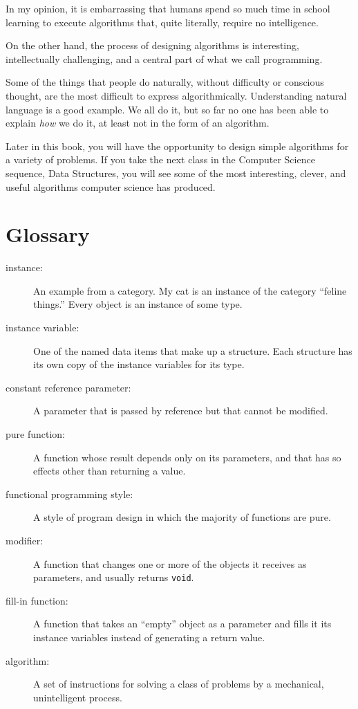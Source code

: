 In my opinion, it is embarrassing that humans spend so much time in
school learning to execute algorithms that, quite literally, require
no intelligence.

On the other hand, the process of designing algorithms is interesting,
intellectually challenging, and a central part of what we call
programming.

Some of the things that people do naturally, without difficulty
or conscious thought, are the most difficult to express
algorithmically.  Understanding natural language is a good
example.  We all do it, but so far no one has been able to
explain {\em how} we do it, at least not in the form of an
algorithm.

Later in this book, you will have the opportunity to design
simple algorithms for a variety of problems.  If you take
the next class in the Computer Science sequence, Data Structures,
you will see some of the most interesting, clever, and
useful algorithms computer science has produced.

\section{Glossary}

\begin{description}

\item[instance:]  An example from a category.  My cat is an
instance of the category ``feline things.''  Every object is
an instance of some type.

\item[instance variable:]  One of the named data items that make
up a structure.  Each structure has its own copy of
the instance variables for its type.

\item[constant reference parameter:]  A parameter that is passed
by reference but that cannot be modified.

\item[pure function:]  A function whose result depends only on its
parameters, and that has so effects other than returning
a value.

\item[functional programming style:]  A style of program design
in which the majority of functions are pure.

\item[modifier:]  A function that changes one or more of the objects
it receives as parameters, and usually returns {\tt void}.

\item[fill-in function:]  A function that takes an ``empty''
object as a parameter and fills it its instance variables instead
of generating a return value.

\item[algorithm:]  A set of instructions for solving a class of
problems by a mechanical, unintelligent process.


\end{description}
